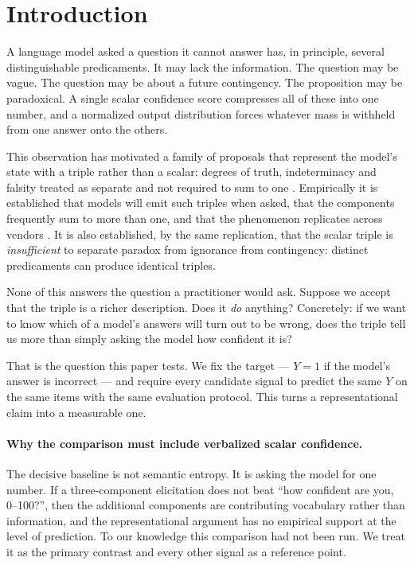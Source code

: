 \documentclass[11pt]{article}
\begin{document}
\section{Introduction}
\label{sec:intro}

A language model asked a question it cannot answer has, in principle, several distinguishable
predicaments. It may lack the information. The question may be vague. The question may be about
a future contingency. The proposition may be paradoxical. A single scalar confidence score
compresses all of these into one number, and a normalized output distribution forces whatever
mass is withheld from one answer onto the others.

This observation has motivated a family of proposals that represent the model's state with a
triple rather than a scalar: degrees of truth, indeterminacy and falsity treated as separate and
not required to sum to one \citep{leyva2026breaking}. Empirically it is established that models
will emit such triples when asked, that the components frequently sum to more than one, and that
the phenomenon replicates across vendors \citep{mason2026tensors}. It is also established, by the
same replication, that the scalar triple is \emph{insufficient} to separate paradox from
ignorance from contingency: distinct predicaments can produce identical triples.

None of this answers the question a practitioner would ask. Suppose we accept that the triple is
a richer description. Does it \emph{do} anything? Concretely: if we want to know which of a
model's answers will turn out to be wrong, does the triple tell us more than simply asking the
model how confident it is?

That is the question this paper tests. We fix the target --- $Y=1$ if the model's answer is
incorrect --- and require every candidate signal to predict the same $Y$ on the same items with
the same evaluation protocol. This turns a representational claim into a measurable one.

\paragraph{Why the comparison must include verbalized scalar confidence.}
The decisive baseline is not semantic entropy. It is asking the model for one number. If a
three-component elicitation does not beat ``how confident are you, 0--100?'', then the additional
components are contributing vocabulary rather than information, and the representational argument
has no empirical support at the level of prediction. To our knowledge this comparison had not
been run. We treat it as the primary contrast and every other signal as a reference point.
\end{document}

